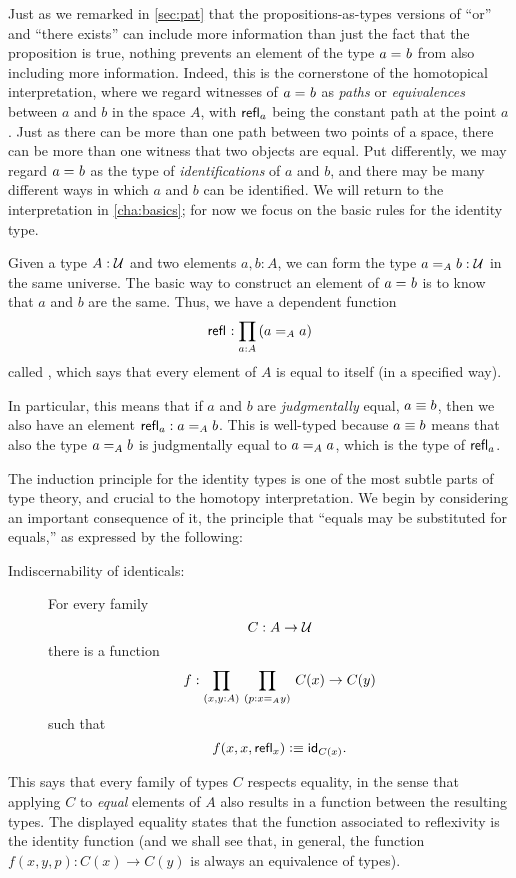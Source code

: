 Just as we remarked in \autoref{sec:pat} that the propositions-as-types versions of ``or'' and ``there exists'' can include more information than just the fact that the proposition is true, nothing prevents an element of the type $\id{a}{b}$ from also including more information.
Indeed, this is the cornerstone of the homotopical interpretation, where we regard witnesses of $\id{a}{b}$ as \emph{paths} or \emph{equivalences} between $a$ and $b$ in the space $A$, with $\refl{a}$ being the
constant path
at the point $a$.  Just as there can be more than one path between two points of a space, there can be more than one witness that two objects are equal.  Put differently, we may regard $\id{a}{b}$ as the type of \emph{identifications} of $a$ and $b$, and there may be many different ways in which $a$ and $b$ can be identified.
We will return to the interpretation in \autoref{cha:basics}; for now we focus on the basic rules for the identity type.

Given a type $A:\UU$ and two elements $a,b:A$, we can form the type $\id[A]{a}{b}:\UU$ in the same universe.
The basic way to construct an element of $\id{a}{b}$ is to know that $a$ and $b$ are the same.
Thus, we have a dependent function
\[\refl{} : \prd{a:A} (\id[A]{a}{a})\]
called ,
%
which says that every element of $A$ is equal to itself (in a specified way).

In particular, this means that if $a$ and $b$ are \emph{judgmentally} equal, $a\jdeq b$, then we also have an element $\refl{a} : \id[A]{a}{b}$.
This is well-typed because $a\jdeq b$ means that also the type $\id[A]{a}{b}$ is judgmentally equal to $\id[A]{a}{a}$, which is the type of $\refl{a}$.

The induction principle for the identity types is one of the most subtle parts of type theory, and crucial to the homotopy interpretation.
We begin by considering an important consequence of it, the principle that ``equals may be substituted for equals,'' as expressed by the following:
%
%
\begin{description}
\item[Indiscernability of identicals:]
For every family 
\[
C : A \to \UU
\]
there is a function
\[
f : \prd{x,y:A}{p:\id[A] x y} C(x) \to C(y)
\]
such that
\[
f(x,x,\refl{x}) \defeq \idfunc[C(x)].
\]
\end{description}
This says that every family of types $C$ respects equality, in the sense that applying $C$ to \emph{equal} elements of $A$ also results in a function between the resulting types. The displayed equality states that the function associated to reflexivity is the identity function (and we shall see that, in general, the function $f(x,y,p): C(x) \to C(y)$ is always an equivalence of types).

